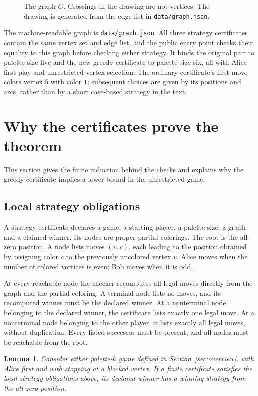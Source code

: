 \documentclass[11pt]{article}
\newtheorem{lemma}{Lemma}
\begin{document}
\begin{figure}[ht]
\centering

\caption{The graph $G$. Crossings in the drawing are not vertices.
The drawing is generated from the edge list in \texttt{data/graph.json}.}
\label{fig:graph}
\end{figure}

The machine-readable graph is \texttt{data/graph.json}. All three strategy
certificates contain the same vertex set and edge list, and the public
entry point checks their equality to this graph before checking either
strategy. It binds the original pair to palette size five and the new
greedy certificate to palette size six, all with Alice-first play and
unrestricted vertex selection. The ordinary
certificate's first move colors vertex $5$ with color $1$; subsequent
choices are given by its positions and arcs, rather than by a short
case-based strategy in the text.

\section{Why the certificates prove the theorem}\label{sec:proof}
This section gives the finite induction behind the checks and explains
why the greedy certificate implies a lower bound in the unrestricted
game.

\subsection{Local strategy obligations}
A strategy certificate declares a game, a starting player, a palette
size, a graph and a claimed winner. Its nodes are proper partial
colorings. The root is the all-zero position. A node lists moves
$(v,c)$, each leading to the position obtained by assigning color $c$
to the previously uncolored vertex $v$. Alice moves when the number of
colored vertices is even; Bob moves when it is odd.

At every reachable node the checker recomputes all legal moves directly
from the graph and the partial coloring. A terminal node lists no moves,
and its recomputed winner must be the declared winner. At a nonterminal
node belonging to the declared winner, the certificate lists exactly
one legal move. At a nonterminal node belonging to the other player,
it lists exactly all legal moves, without duplication. Every listed
successor must be present, and all nodes must be reachable from the root.

\begin{lemma}\label{lem:strategy}
Consider either palette-$k$ game defined in
Section~\ref{sec:overview}, with Alice first and with stopping at a
blocked vertex. If a finite certificate satisfies the local strategy
obligations above, its declared winner has a winning strategy from the
all-zero position.
\end{lemma}
\end{document}
